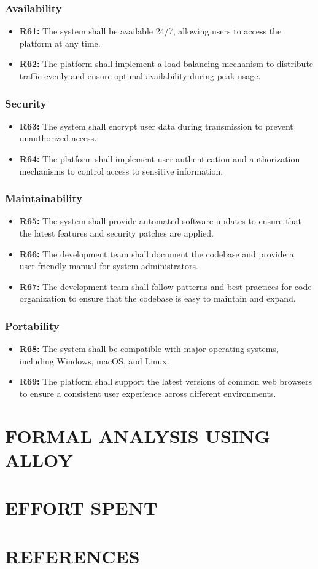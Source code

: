 \documentclass{article}
\begin{document}
\subsubsection{Availability}
\begin{itemize}
  \item \textbf{R61:} The system shall be available 24/7, allowing users to access the platform at any time.
  \item \textbf{R62:} The platform shall implement a load balancing mechanism to distribute traffic evenly and ensure optimal availability during peak usage.
\end{itemize}

\subsubsection{Security}
\begin{itemize}
  \item \textbf{R63:} The system shall encrypt user data during transmission to prevent unauthorized access.
  \item \textbf{R64:} The platform shall implement user authentication and authorization mechanisms to control access to sensitive information.
\end{itemize}

\subsubsection{Maintainability}
\begin{itemize}
  \item \textbf{R65:} The system shall provide automated software updates to ensure that the latest features and security patches are applied.
  \item \textbf{R66:} The development team shall document the codebase and provide a user-friendly manual for system administrators.
  \item \textbf{R67:} The development team shall follow patterns and best practices for code organization to ensure that the codebase is easy to maintain and expand.
\end{itemize}

\subsubsection{Portability}
\begin{itemize}
  \item \textbf{R68:} The system shall be compatible with major operating systems, including Windows, macOS, and Linux.
  \item \textbf{R69:} The platform shall support the latest versions of common web browsers to ensure a consistent user experience across different environments.
\end{itemize}

\section{FORMAL ANALYSIS USING ALLOY}


\section{EFFORT SPENT}

\section{REFERENCES}
\end{document}
